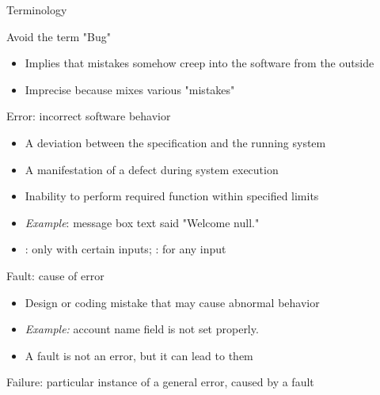 \begin{frame}{Terminology}
  \begin{block}{Avoid the term "Bug"}
    \begin{itemize}
    \item Implies that mistakes somehow creep into the software from the outside
    \item Imprecise because mixes various "mistakes"
    \end{itemize}      
  \end{block}\vspace{-.5\baselineskip}

  \begin{block}{\alert{Error}: incorrect software behavior}
    \begin{itemize}
    \item A deviation between the specification and the running system
    \item A manifestation of a defect during system execution
    \item Inability to perform required function within specified limits
    \item \textit{Example}: message box text said "Welcome null."
    \item {}: only with certain inputs;
       : for any input
    \end{itemize}
  \end{block}\vspace{-.5\baselineskip}

  \begin{block}{\alert{Fault}: cause of error}
    \begin{itemize}
    \item Design or coding  mistake that may cause abnormal behavior
    \item \textit{Example:} account name field is not set properly.
    \item A fault is not an error, but it can lead to them 
    \end{itemize}
  \end{block}\vspace{-.5\baselineskip}

  \begin{block}{\alert{Failure}: particular instance of a general error, caused by a fault}
    
  \end{block}
\end{frame}

